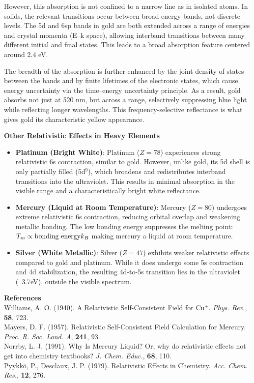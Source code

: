 \begin{technical}
However, this absorption is not confined to a narrow line as in isolated atoms. In solids, the relevant transitions occur between broad energy bands, not discrete levels. The 5d and 6sp bands in gold are both extended across a range of energies and crystal momenta (E–k space), allowing interband transitions between many different initial and final states. This leads to a broad absorption feature centered around 2.4 eV.

The breadth of the absorption is further enhanced by the joint density of states between the bands and by finite lifetimes of the electronic states, which cause energy uncertainty via the time–energy uncertainty principle. As a result, gold absorbs not just at 520 nm, but across a range, selectively suppressing blue light while reflecting longer wavelengths. This frequency-selective reflectance is what gives gold its characteristic yellow appearance.


\noindent\textbf{Other Relativistic Effects in Heavy Elements}  

\begin{itemize}[leftmargin=*]
    \item \textbf{Platinum (Bright White)}: Platinum (\(Z=78\)) experiences strong relativistic 6s contraction, similar to gold. However, unlike gold, its 5d shell is only partially filled (5d\(^9\)), which broadens and redistributes interband transitions into the ultraviolet. This results in minimal absorption in the visible range and a characteristically bright white reflectance.
    
    \item \textbf{Mercury (Liquid at Room Temperature)}: Mercury (\(Z=80\)) undergoes extreme relativistic 6s contraction, reducing orbital overlap and weakening metallic bonding. The low bonding energy suppresses the melting point:$T_m \propto \text{bonding energy}\\{k_B}$
    making mercury a liquid at room temperature.

    \item \textbf{Silver (White Metallic)}: Silver (\(Z=47\)) exhibits weaker relativistic effects compared to gold and platinum. While it does undergo some 5s contraction and 4d stabilization, the resulting 4d-to-5s transition lies in the ultraviolet (~3.7eV), outside the visible spectrum. 
\end{itemize}


\vspace{0.5em}
\noindent\textbf{References}  \\
Williams, A. O. (1940). A Relativistic Self-Consistent Field for Cu\(^+\). \textit{Phys. Rev.}, \textbf{58}, 723.\\
Mayers, D. F. (1957). Relativistic Self-Consistent Field Calculation for Mercury. \textit{Proc. R. Soc. Lond. A}, \textbf{241}, 93.\\
Norrby, L. J. (1991). Why Is Mercury Liquid? Or, why do relativistic effects not get into chemistry textbooks? \textit{J. Chem. Educ.}, \textbf{68}, 110.\\
Pyykkö, P., Desclaux, J. P. (1979). Relativistic Effects in Chemistry. \textit{Acc. Chem. Res.}, \textbf{12}, 276.
\end{technical}
